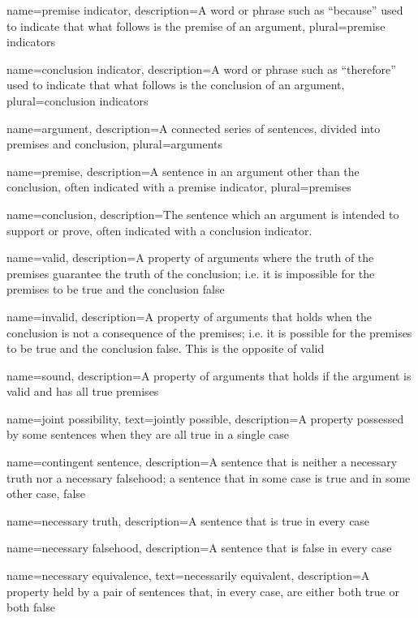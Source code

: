 {
name=premise indicator,
description={A word or phrase such as ``because'' used to indicate that what follows is the premise of an argument},
plural=premise indicators
}

{
name=conclusion indicator,
description={A word or phrase such as ``therefore'' used to indicate that what follows is the conclusion of an argument},
plural=conclusion indicators
}

{
name=argument,
description={A connected series of sentences, divided into \gls{premise}s and \gls{conclusion}},
plural=arguments
}

{
name=premise,
description={A sentence in an \gls{argument} other than the \gls{conclusion}, often indicated with a premise indicator},
plural=premises
}

{
name=conclusion,
description={The sentence which an argument is intended to support or prove, often indicated with a conclusion indicator.}
}

{
name=valid,
description={A property of arguments where the truth of the premises guarantee the truth of the conclusion; i.e. it is impossible for the premises to be true and the conclusion false}
}

{
name=invalid,
description={A property of arguments that holds when the conclusion is not a consequence of the premises; i.e. it is possible for the premises to be true and the conclusion false. This is the opposite of \gls{valid}}
}

{
name=sound,
description={A property of arguments that holds if the argument is valid and has all true premises}
}


{
name=joint possibility,
text={jointly possible},
description={A property possessed by some sentences when they are all true in a single case}
}

{
name=contingent sentence,
description={A sentence that is neither a \gls{necessary truth} nor a \gls{necessary falsehood}; a sentence that in some case is true and in some other case, false}
}

{
name={necessary truth},
description={A sentence that is true in every case}
}

{
name={necessary falsehood},
description={A sentence that is false in every case}
}


{
name={necessary equivalence},
text={necessarily equivalent},
description={A property held by a pair of sentences that, in every case, are either both true or both false}
}
